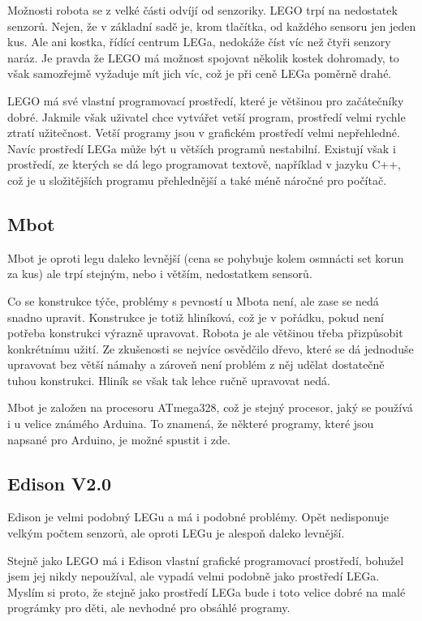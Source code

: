 \documentclass{template/socthesis}
\begin{document}
Možnosti robota se z velké části odvíjí od senzoriky. LEGO trpí na nedostatek senzorů. Nejen, že v základní sadě je, krom tlačítka, od každého sensoru jen jeden kus. Ale ani kostka, řídící centrum LEGa, nedokáže číst víc než čtyři senzory naráz. Je pravda že LEGO má možnost spojovat několik kostek dohromady, to však samozřejmě vyžaduje mít jich víc, což je při ceně LEGa poměrně drahé.


LEGO má své vlastní programovací prostředí, které je většinou pro začátečníky dobré. Jakmile však uživatel chce vytvářet vetší program, prostředí velmi rychle ztratí užitečnost. Vetší programy jsou v grafickém prostředí velmi nepřehledné. Navíc prostředí LEGa může být u větších programů nestabilní. Existují však i prostředí, ze kterých se dá lego programovat textově, například v jazyku C++, což je u složitějších programu přehlednější a také méně náročné pro počítač.

\subsection{Mbot}
Mbot je oproti legu daleko levnější (cena se pohybuje kolem osmnácti set korun za kus) ale trpí stejným, nebo i větším, nedostatkem sensorů. 

Co se konstrukce týče, problémy s pevností u Mbota není, ale zase se nedá snadno upravit. Konstrukce je totiž hliníková, což je v pořádku, pokud není potřeba konstrukci výrazně upravovat. Robota je ale většinou třeba přizpůsobit konkrétnímu užití.
 Ze zkušenosti se nejvíce osvědčilo dřevo, které se dá jednoduše upravovat bez větší námahy a zároveň není problém z něj udělat dostatečně tuhou konstrukci. Hliník se však tak lehce ručně upravovat nedá.
 
Mbot je založen na procesoru ATmega328, což je stejný procesor, jaký se používá i u velice známého Arduina. %
To znamená, že některé programy, které jsou napsané pro Arduino, je možné spustit i zde.

\subsection{Edison V2.0}
Edison %
je velmi podobný LEGu a má i podobné problémy. Opět nedisponuje velkým počtem senzorů, ale oproti LEGu je alespoň daleko levnější. 

Stejně jako LEGO má i Edison vlastní grafické programovací prostředí, bohužel jsem jej nikdy nepoužíval, ale vypadá velmi podobně jako prostředí LEGa. Myslím si proto, že stejně jako prostředí LEGa bude i toto velice dobré na malé prográmky pro děti, ale nevhodné pro obsáhlé programy.
\end{document}
